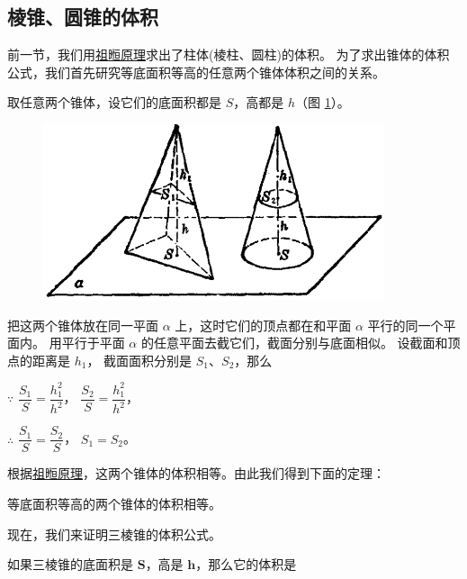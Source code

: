 \subsection{棱锥、圆锥的体积}\label{subsec:2-9}
\begin{enhancedline}

前一节，我们用\hyperref[zgyl]{祖暅原理}求出了柱体(棱柱、圆柱)的体积。
为了求出锥体的体积公式，我们首先研究等底面积等高的任意两个锥体体积之间的关系。

取任意两个锥体，设它们的底面积都是 $S$，高都是 $h$（图 \ref{fig:ltjh-2-63}）。

\begin{figure}[htbp]
    \centering
    \includegraphics[width=10cm]{../pic/ltjh-ch2-63.png}
    \caption{}\label{fig:ltjh-2-63}
\end{figure}

把这两个锥体放在同一平面 $\alpha$ 上，这时它们的顶点都在和平面 $\alpha$ 平行的同一个平面内。
用平行于平面 $\alpha$ 的任意平面去截它们，截面分别与底面相似。 设截面和顶点的距离是 $h_1$，
截面面积分别是 $S_1$、$S_2$，那么

$\because$ \quad $\dfrac{S_1}{S} = \dfrac{h_1^2}{h^2}$， \quad $\dfrac{S_2}{S} = \dfrac{h_1^2}{h^2}$，

$\therefore$ \quad $\dfrac{S_1}{S} = \dfrac{S_2}{S}$， \quad  $S_1 = S_2$。

根据\hyperref[zgyl]{祖暅原理}，这两个锥体的体积相等。由此我们得到下面的定理：

\begin{dingli}
    等底面积等高的两个锥体的体积相等。
\end{dingli}

现在，我们来证明三棱锥的体积公式。

\begin{dingli}[定理][dl:slzhui-tj]
    如果三棱锥的底面积是 $\bm{S}$，高是 $\bm{h}$，那么它的体积是
    \begin{center}
     \end{center}
\end{dingli}


\end{enhancedline}
